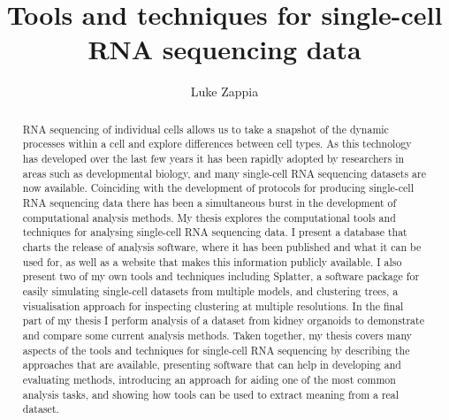 \documentclass[11pt,a4paper,titlepage,twoside,openright]{style/unimelbthesis}
\title{Tools and techniques for single-cell RNA sequencing data}
\author{Luke Zappia}
\makeatletter
\newcommand{\verbatimfont}[1]{\renewcommand{\verbatim@font}{\ttfamily#1}}
\theoremstyle{definition}
\theoremstyle{definition}
\theoremstyle{definition}
\theoremstyle{remark}
\makeatother
\begin{document}

\verbatimfont{\scriptsize}

\begin{frontmatter}

\frontmatterheadings


  \maketitle


  \begin{abstract}
    RNA sequencing of individual cells allows us to take a snapshot of the dynamic processes within a cell and explore differences between cell types. As this technology has developed over the last few years it has been rapidly adopted by researchers in areas such as developmental biology, and many single-cell RNA sequencing datasets are now available. Coinciding with the development of protocols for producing single-cell RNA sequencing data there has been a simultaneous burst in the development of computational analysis methods. My thesis explores the computational tools and techniques for analysing single-cell RNA sequencing data. I present a database that charts the release of analysis software, where it has been published and what it can be used for, as well as a website that makes this information publicly available. I also present two of my own tools and techniques including Splatter, a software package for easily simulating single-cell datasets from multiple models, and clustering trees, a visualisation approach for inspecting clustering at multiple resolutions. In the final part of my thesis I perform analysis of a dataset from kidney organoids to demonstrate and compare some current analysis methods. Taken together, my thesis covers many aspects of the tools and techniques for single-cell RNA sequencing by describing the approaches that are available, presenting software that can help in developing and evaluating methods, introducing an approach for aiding one of the most common analysis tasks, and showing how tools can be used to extract meaning from a real dataset.
  \end{abstract}



\end{frontmatter}
\end{document}

